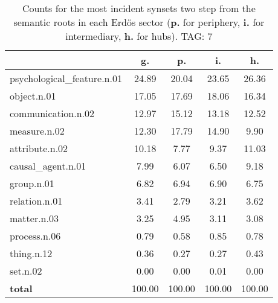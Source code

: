 \begin{table}[h!]
\begin{center}
\begin{tabular}{| l || c | c | c | c |}\hline
 & {\bf g.} & {\bf p.} & {\bf i.} & {\bf h.} \\\hline\hline
psychological\_feature.n.01 & 24.89  & 20.04  & 23.65  & 26.36 \\\hline
object.n.01 & 17.05  & 17.69  & 18.06  & 16.34 \\\hline
communication.n.02 & 12.97  & 15.12  & 13.18  & 12.52 \\\hline
measure.n.02 & 12.30  & 17.79  & 14.90  & 9.90 \\\hline
attribute.n.02 & 10.18  & 7.77  & 9.37  & 11.03 \\\hline
causal\_agent.n.01 & 7.99  & 6.07  & 6.50  & 9.18 \\\hline
group.n.01 & 6.82  & 6.94  & 6.90  & 6.75 \\\hline
relation.n.01 & 3.41  & 2.79  & 3.21  & 3.62 \\\hline
matter.n.03 & 3.25  & 4.95  & 3.11  & 3.08 \\\hline
process.n.06 & 0.79  & 0.58  & 0.85  & 0.78 \\\hline
thing.n.12 & 0.36  & 0.27  & 0.27  & 0.43 \\\hline
set.n.02 & 0.00  & 0.00  & 0.01  & 0.00 \\\hline\hline
{{\bf total}} & 100.00  & 100.00  & 100.00  & 100.00 \\\hline
\end{tabular}
\caption{Counts for the most incident synsets two step from the semantic roots in each Erd\"os sector ({\bf p.} for periphery, {\bf i.} for intermediary, {\bf h.} for hubs). TAG: 7}
\end{center}
\end{table}